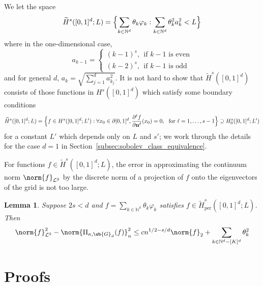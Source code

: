 \documentclass{article}
\newcommand{\1}{\mathbf{1}}
\newcommand{\Leb}{\mathcal{L}}
\newcommand{\wt}[1]{\widetilde{#1}}
\theoremstyle{alden}
\theoremstyle{aldenthm}
\newtheorem{lemma}{Lemma}
\theoremstyle{definition}
\theoremstyle{remark}
\begin{document}
We let the space 
\begin{equation*}
\wt{H}^{s}([0,1]^d;L) = \Bigl\{ \sum_{k \in \mathbb{N}^d} \theta_k \varphi_k: \sum_{k \in \mathbb{N}^d} \theta_k^2 a_k^{2} < L \Bigr\}
\end{equation*}
where in the one-dimensional case,
\begin{equation*}
a_{k - 1} =
\begin{cases*}
(k - 1)^s,~~ \textrm{if $k - 1$ is even} \\
(k - 2)^s,~~ \textrm{if $k - 1$ is odd}
\end{cases*}
\end{equation*}
and for general $d$, $a_k = \sqrt{\sum_{j = 1}^{d} a_{k_j}^2}$. It is not hard to show that $\wt{H}^s([0,1]^d)$ consists of those functions in $H^s([0,1]^d)$ which satisfy some boundary conditions
\begin{equation*}
\wt{H}^s([0,1]^d;L) = \Bigl\{f \in H^{s}([0,1]^d;L'): \forall x_0 \in \partial [0,1]^d, \frac{\partial^{\ell} f}{\partial \mathbf{n}^{\ell}}(x_0) = 0,~~\textrm{for $\ell = 1,\ldots,s-1$} \Bigr \} \supseteq H_0^s([0,1]^d;L')
\end{equation*}
for a constant $L'$ which depends only on $L$ and $s'$; we work through the details for the case $d = 1$ in Section~\ref{subsec:sobolev_class_equivalence}.

For functions $f \in \wt{H}^{s}([0,1]^d;L)$, the error in approximating the continuum norm $\norm{f}_{\Leb^2}$ by the discrete norm of a projection of $f$ onto the eigenvectors of the grid is not too large. 

\begin{lemma}
	\label{lem:grid_sobolev_approximation_error_4}
	Suppose $2s < d$ and $f = \sum_{k \in \mathbb{N}^k} \theta_k \varphi_k$ satisfies $f \in \wt{H}_{\textrm{per}}^{s}([0,1]^d;L)$. Then
	\begin{equation*}
	\norm{f}_{\Leb^2}^2 - \norm{\Pi_{\kappa,\wb{G}_d}(f)}_{n}^2 \leq c n^{1/2 - s/d} \norm{f}_2 + \sum_{k \in \mathbb{N}^d - [K]^d} \theta_k^2
	\end{equation*}
\end{lemma}

\section{Proofs}
\end{document}
